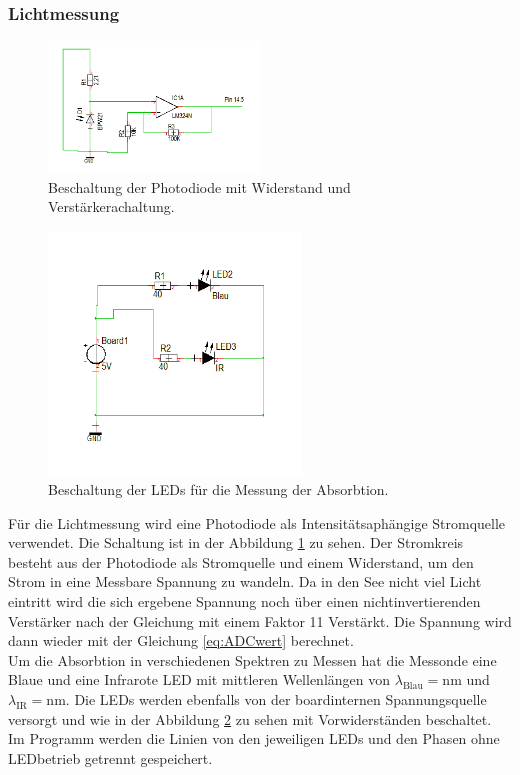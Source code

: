 \documentclass[12pt,a4paper,titlepage,headinclude,bibtotoc]{scrartcl}
\begin{document}
\subsubsection{Lichtmessung}
\begin{figure}[!h]
\centering
\includegraphics[width=0.5\textwidth]{Fotos/PhotodiodeSchaltung.png}
\caption{Beschaltung der Photodiode mit Widerstand und Verstärkerachaltung.}
\label{fig:PhotodiodeSchaltung}
\end{figure}
\begin{figure}[!h]
\centering
\includegraphics[width=0.6\textwidth]{Fotos/LEDSchaltung.png}
\caption{Beschaltung der LEDs für die Messung der Absorbtion.}
\label{fig:LEDSchaltung}
\end{figure}
Für die Lichtmessung wird eine Photodiode als Intensitätsaphängige Stromquelle verwendet.
Die Schaltung ist in der Abbildung \ref{fig:PhotodiodeSchaltung} zu sehen.
Der Stromkreis besteht aus der Photodiode als Stromquelle und einem Widerstand, um den Strom in eine Messbare Spannung zu wandeln.
Da in den See nicht viel Licht eintritt wird die sich ergebene Spannung noch über einen nichtinvertierenden Verstärker nach der Gleichung %
mit einem Faktor 11 Verstärkt.
Die Spannung wird dann wieder mit der Gleichung \eqref{eq:ADCwert} berechnet.\\
Um die Absorbtion in verschiedenen Spektren zu Messen hat die Messonde eine Blaue und eine Infrarote LED %
mit mittleren Wellenlängen von $\lambda_\text{Blau}=\si{\nano\meter}$ und $\lambda_\text{IR}=\si{\nano\meter}$. %
Die LEDs werden ebenfalls von der boardinternen Spannungsquelle versorgt und wie in der Abbildung \ref{fig:LEDSchaltung} zu sehen mit Vorwiderständen beschaltet.\\
Im Programm werden die Linien von den jeweiligen LEDs und den Phasen ohne LEDbetrieb getrennt gespeichert.
\end{document}
